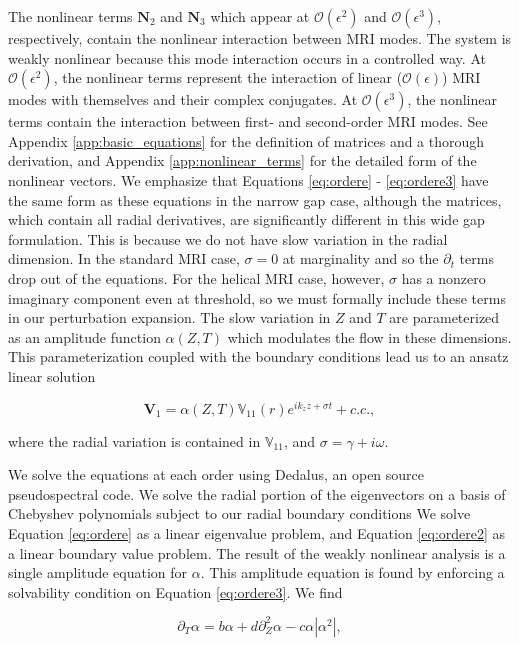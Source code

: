 \documentclass{emulateapj}
\newcommand{\beq}{\begin{equation}}
\newcommand{\eeq}{\end{equation}}
\begin{document}
The nonlinear terms $\mathbf{N}_2$ and $\mathbf{N}_3$ which appear at $\mathcal{O}(\epsilon^2)$ and $\mathcal{O}(\epsilon^3)$, respectively, contain the nonlinear interaction between MRI modes. The system is weakly nonlinear because this mode interaction occurs in a controlled way. At $\mathcal{O}(\epsilon^2)$, the nonlinear terms represent the interaction of linear ($\mathcal{O}(\epsilon)$) MRI modes with themselves and their complex conjugates. At $\mathcal{O}(\epsilon^3)$, the nonlinear terms contain the interaction between first- and second-order MRI modes. See Appendix \ref{app:basic_equations} for the definition of matrices and a thorough derivation, and Appendix \ref{app:nonlinear_terms} for the detailed form of the nonlinear vectors. We emphasize that Equations \ref{eq:ordere} - \ref{eq:ordere3} have the same form as these equations in the narrow gap case, although the matrices, which contain all radial derivatives, are significantly different in this wide gap formulation. This is because we do not have slow variation in the radial dimension. In the standard MRI case, $\sigma = 0$ at marginality and so the $\partial_t$ terms drop out of the equations. For the helical MRI case, however, $\sigma$ has a nonzero imaginary component even at threshold, so we must formally include these terms in our perturbation expansion. The slow variation in $Z$ and $T$ are parameterized as an amplitude function $\alpha(Z, T)$ which modulates the flow in these dimensions. This parameterization coupled with the boundary conditions lead us to an ansatz linear solution 

\beq
\label{eq:ansatz}
\mathbf{V}_1 = \alpha(Z, T) \mathbb{V}_{11}(r) e^{i k_z z + \sigma t} + c.c.,
\eeq

where the radial variation is contained in $\mathbb{V}_{11}$, and $\sigma = \gamma + i\omega$. 

We solve the equations at each order using Dedalus, an open source pseudospectral code. We solve the radial portion of the eigenvectors on a basis of Chebyshev polynomials subject to our radial boundary conditions
We solve Equation \ref{eq:ordere} as a linear eigenvalue problem, and Equation \ref{eq:ordere2} as a linear boundary value problem. 
The result of the weakly nonlinear analysis is a single amplitude equation for $\alpha$. This amplitude equation is found by enforcing a solvability condition on Equation \ref{eq:ordere3}. We find

\beq
 \label{eq:gle}
\partial_T \alpha = b \alpha + d \partial_Z^2 \alpha - c \alpha \left|\alpha^2\right|,
\eeq
\end{document}
